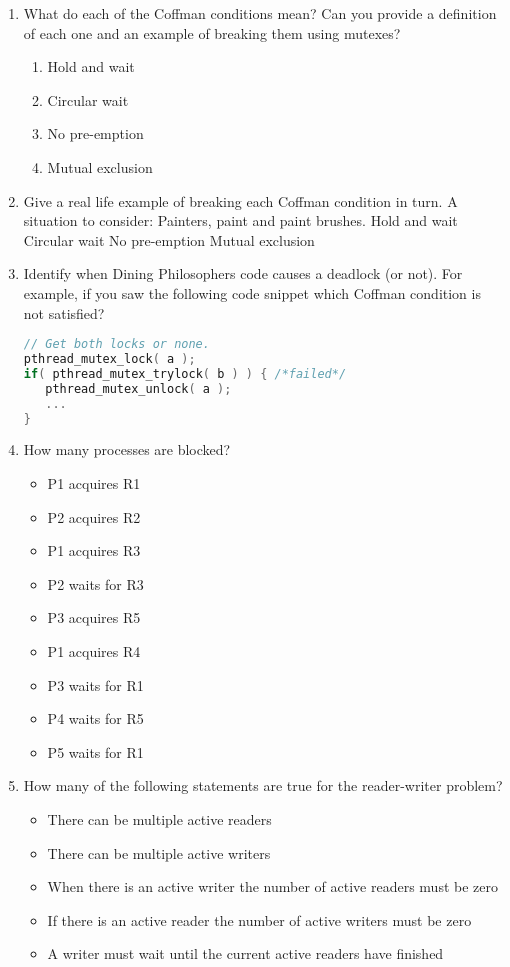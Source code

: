 \begin{enumerate}

\item What do each of the Coffman conditions mean? Can you provide a definition of each one and an example of breaking them using mutexes?

  \begin{enumerate}
  \item Hold and wait
  \item Circular wait
  \item No pre-emption
  \item Mutual exclusion
  \end{enumerate}

\item Give a real life example of breaking each Coffman condition in turn. A situation to consider: Painters, paint and paint brushes. Hold and wait Circular wait No pre-emption Mutual exclusion

\item Identify when Dining Philosophers code causes a deadlock (or not). For example, if you saw the following code snippet which Coffman condition is not satisfied?

\begin{lstlisting}[language=C]
// Get both locks or none.
pthread_mutex_lock( a );
if( pthread_mutex_trylock( b ) ) { /*failed*/
   pthread_mutex_unlock( a );
   ...
}
\end{lstlisting}

\item How many processes are blocked?

\begin{itemize}
\tightlist
\item
  P1 acquires R1
\item
  P2 acquires R2
\item
  P1 acquires R3
\item
  P2 waits for R3
\item
  P3 acquires R5
\item
  P1 acquires R4
\item
  P3 waits for R1
\item
  P4 waits for R5
\item
  P5 waits for R1
\end{itemize}

\item How many of the following statements are true for the reader-writer problem?

\begin{itemize}
\tightlist
\item
  There can be multiple active readers
\item
  There can be multiple active writers
\item
  When there is an active writer the number of active readers must be zero
\item
  If there is an active reader the number of active writers must be zero
\item
  A writer must wait until the current active readers have finished
\end{itemize}

\end{enumerate}

